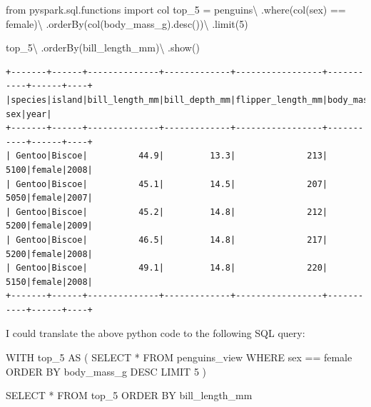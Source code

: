 \documentclass[
  11pt,
  letterpaper,
  DIV=11,
  numbers=noendperiod]{scrreprt}
\newenvironment{Shaded}{\begin{snugshade}}{\end{snugshade}}
\newcommand{\DecValTok}[1]{\textcolor[rgb]{0.68,0.00,0.00}{#1}}
\newcommand{\ImportTok}[1]{\textcolor[rgb]{0.00,0.46,0.62}{#1}}
\newcommand{\KeywordTok}[1]{\textcolor[rgb]{0.00,0.23,0.31}{#1}}
\newcommand{\NormalTok}[1]{\textcolor[rgb]{0.00,0.23,0.31}{#1}}
\newcommand{\OperatorTok}[1]{\textcolor[rgb]{0.37,0.37,0.37}{#1}}
\newcommand{\StringTok}[1]{\textcolor[rgb]{0.13,0.47,0.30}{#1}}
\begin{document}
\begin{Shaded}
\begin{Highlighting}[]
\ImportTok{from}\NormalTok{ pyspark.sql.functions }\ImportTok{import}\NormalTok{ col}
\NormalTok{top\_5 }\OperatorTok{=}\NormalTok{ penguins}\OperatorTok{\textbackslash{}}
\NormalTok{    .where(col(}\StringTok{\textquotesingle{}sex\textquotesingle{}}\NormalTok{) }\OperatorTok{==} \StringTok{\textquotesingle{}female\textquotesingle{}}\NormalTok{)}\OperatorTok{\textbackslash{}}
\NormalTok{    .orderBy(col(}\StringTok{\textquotesingle{}body\_mass\_g\textquotesingle{}}\NormalTok{).desc())}\OperatorTok{\textbackslash{}}
\NormalTok{    .limit(}\DecValTok{5}\NormalTok{)}

\NormalTok{top\_5}\OperatorTok{\textbackslash{}}
\NormalTok{    .orderBy(}\StringTok{\textquotesingle{}bill\_length\_mm\textquotesingle{}}\NormalTok{)}\OperatorTok{\textbackslash{}}
\NormalTok{    .show()}
\end{Highlighting}
\end{Shaded}

\begin{verbatim}
+-------+------+--------------+-------------+-----------------+-----------+------+----+
|species|island|bill_length_mm|bill_depth_mm|flipper_length_mm|body_mass_g|   sex|year|
+-------+------+--------------+-------------+-----------------+-----------+------+----+
| Gentoo|Biscoe|          44.9|         13.3|              213|       5100|female|2008|
| Gentoo|Biscoe|          45.1|         14.5|              207|       5050|female|2007|
| Gentoo|Biscoe|          45.2|         14.8|              212|       5200|female|2009|
| Gentoo|Biscoe|          46.5|         14.8|              217|       5200|female|2008|
| Gentoo|Biscoe|          49.1|         14.8|              220|       5150|female|2008|
+-------+------+--------------+-------------+-----------------+-----------+------+----+
\end{verbatim}

I could translate the above python code to the following SQL query:

\begin{Shaded}
\begin{Highlighting}[]
\KeywordTok{WITH}\NormalTok{ top\_5 }\KeywordTok{AS}\NormalTok{ (}
    \KeywordTok{SELECT} \OperatorTok{*}
    \KeywordTok{FROM}\NormalTok{ penguins\_view}
    \KeywordTok{WHERE}\NormalTok{ sex }\OperatorTok{==} \StringTok{\textquotesingle{}female\textquotesingle{}}
    \KeywordTok{ORDER} \KeywordTok{BY}\NormalTok{ body\_mass\_g }\KeywordTok{DESC}
    \KeywordTok{LIMIT} \DecValTok{5}
\NormalTok{)}

\KeywordTok{SELECT} \OperatorTok{*}
\KeywordTok{FROM}\NormalTok{ top\_5}
\KeywordTok{ORDER} \KeywordTok{BY}\NormalTok{ bill\_length\_mm}
\end{Highlighting}
\end{Shaded}
\end{document}
